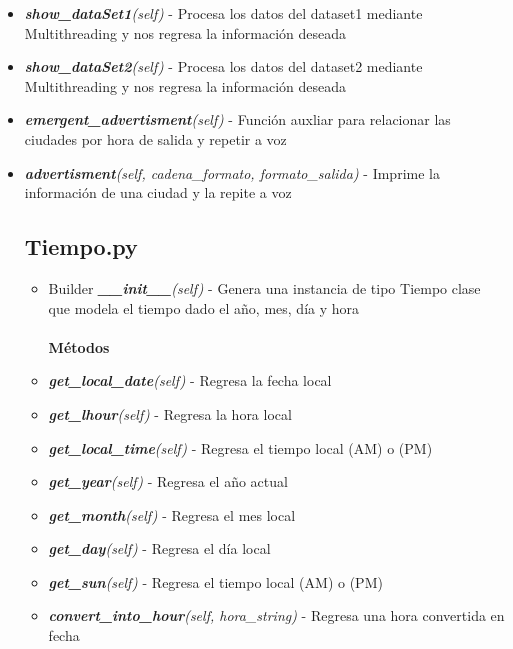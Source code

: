 \documentclass{article}
\begin{document}
\begin{itemize}
            \item \textit{\textbf{show\_dataSet1}(self)} - Procesa los datos del dataset1 mediante Multithreading y nos regresa la información deseada
            \item \textit{\textbf{show\_dataSet2}(self)} - Procesa los datos del dataset2 mediante Multithreading y nos regresa la información deseada
            \item \textit{\textbf{emergent\_advertisment}(self)} - Función auxliar para relacionar las ciudades por hora de salida y repetir a voz
            \item \textit{\textbf{advertisment}(self, cadena\_formato, formato\_salida)} - Imprime la información de una ciudad  y la repite a voz
        \subsection{Tiempo.py}
            \begin{itemize}
                \item Builder \textit{\textbf{\_\_init\_\_}(self)} - Genera una instancia de tipo Tiempo clase que modela el tiempo dado el año, mes, día y hora \\\\
                \textbf{Métodos}
                 \item \textit{\textbf{get\_local\_date}(self)} - Regresa la fecha local
                 \item \textit{\textbf{get\_lhour}(self)} - Regresa la hora local
                 \item \textit{\textbf{get\_local\_time}(self)} - Regresa el tiempo local (AM) o (PM)
                 \item \textit{\textbf{get\_year}(self)} - Regresa el año actual
                 \item \textit{\textbf{get\_month}(self)} - Regresa el mes local
                 \item \textit{\textbf{get\_day}(self)} - Regresa el día local
                 \item \textit{\textbf{get\_sun}(self)} - Regresa el tiempo local (AM) o (PM)
                 \item \textit{\textbf{convert\_into\_hour}(self, hora\_string)} - Regresa una hora convertida en fecha
            \end{itemize}
        

\end{itemize}
\end{document}
